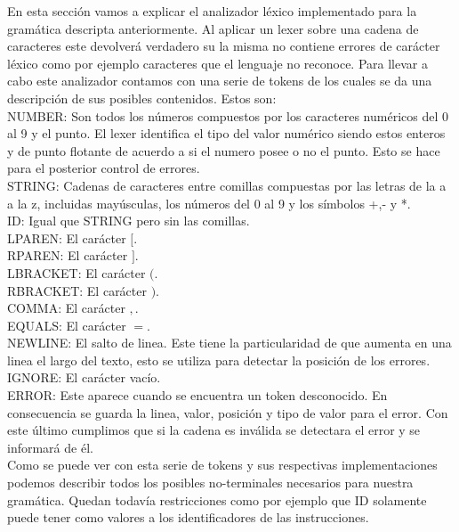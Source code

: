 En esta sección vamos a explicar el analizador léxico implementado para la gramática descripta anteriormente. Al aplicar un
lexer sobre una cadena de caracteres este devolverá verdadero su la misma no contiene errores de carácter léxico como por
ejemplo caracteres que el lenguaje no reconoce. Para llevar a cabo este analizador contamos con una serie de tokens de
los cuales se da una descripción de sus posibles contenidos. Estos son:\\

NUMBER: Son todos los números compuestos por los caracteres numéricos del 0 al 9 y el punto. El lexer identifica el tipo
del valor numérico siendo estos enteros y de punto flotante de acuerdo a si el numero posee o no el punto. Esto se hace
para el posterior control de errores.\\

STRING: Cadenas de caracteres entre comillas compuestas por las letras de la a a la z, incluidas mayúsculas, los números del
0 al 9 y los símbolos +,- y *.\\

ID: Igual que STRING pero sin las comillas.\\

LPAREN: El carácter $[$.\\

RPAREN: El carácter $]$.\\

LBRACKET: El carácter $($.\\

RBRACKET: El carácter $)$.\\

COMMA: El carácter $,$.\\

EQUALS: El carácter $=$.\\

NEWLINE: El salto de linea. Este tiene la particularidad de que aumenta en una linea el largo del texto, esto se
utiliza para detectar la posición de los errores.\\

IGNORE: El carácter vacío.\\

ERROR: Este aparece cuando se encuentra un token desconocido. En consecuencia se guarda la linea, valor, posición y
tipo de valor para el error. Con este último cumplimos que si la cadena es inválida se detectara el error y se informará de él.\\

Como se puede ver con esta serie de tokens y sus respectivas implementaciones podemos describir todos los posibles no-terminales
necesarios para nuestra gramática. Quedan todavía restricciones como por ejemplo que ID solamente puede tener como valores a los
identificadores de las instrucciones.\\
